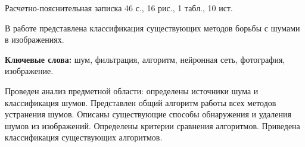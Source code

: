 Расчетно-пояснительная записка 46 с., 16 рис., 1 табл., 10 ист.

В работе представлена классификация существующих методов борьбы с шумами в изображениях.

\textbf{Ключевые слова:} шум, фильтрация, алгоритм, нейронная сеть, фотография, изображение.

Проведен анализ предметной области: определены источники шума и классификация шумов. 
Представлен общий алгоритм работы всех методов устранения шумов. 
Описаны существующие способы обнаружения и удаления шумов из изображений.
Определены критерии сравнения алгоритмов. 
Приведена классификация существующих алгоритмов.